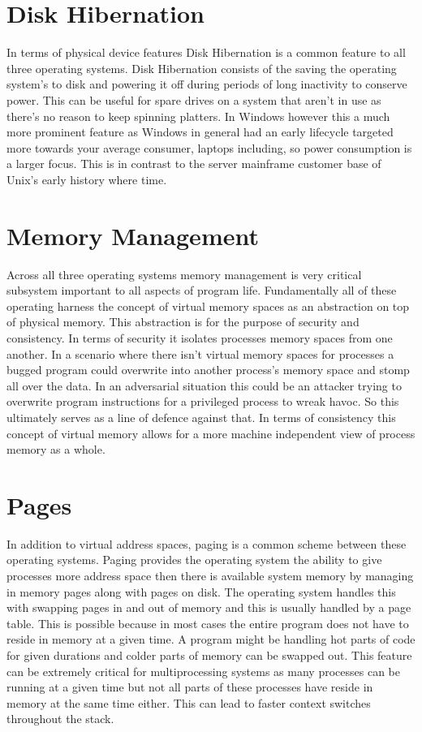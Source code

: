 \documentclass[letterpaper,10pt,draftclsnofoot,onecolumn]{IEEEtran}
\begin{document}
\section{Disk Hibernation}
In terms of physical device features Disk Hibernation is a common feature to all three operating systems. Disk Hibernation consists of the saving the operating system’s to disk and powering it off during periods of long inactivity to conserve power. This can be useful for spare drives on a system that aren’t in use as there’s no reason to keep spinning platters. In Windows however this a much more prominent feature as Windows in general had an early lifecycle targeted more towards your average consumer, laptops including, so power consumption is a larger focus. This is in contrast to the server mainframe customer base of Unix’s early history where time.\\
\newpage
\section{Memory Management}
Across all three operating systems memory management is very critical subsystem important to all aspects of program life. Fundamentally all of these operating harness the concept of virtual memory spaces as an abstraction on top of physical memory. This abstraction is for the purpose of security and consistency. In terms of security it isolates processes memory spaces from one another. In a scenario where there isn’t virtual memory spaces for processes a bugged program could overwrite into another process's memory space and stomp all over the data. In an adversarial situation this could be an attacker trying to overwrite program instructions for a privileged process to wreak havoc. So this ultimately serves as a line of defence against that. In terms of consistency this concept of virtual memory allows for a more machine independent view of process memory as a whole.\\
\section{Pages}
In addition to virtual address spaces, paging is a common scheme between these operating systems. Paging provides the operating system the ability to give processes more address space then there is available system memory by managing in memory pages along with pages on disk. The operating system handles this with swapping pages in and out of memory and this is usually handled by a page table. This is possible because in most cases the entire program does not have to reside in memory at a given time. A program might be handling hot parts of code for given durations and colder parts of memory can be swapped out. This feature can be extremely critical for multiprocessing systems as many processes can be running at a given time but not all parts of these processes have reside in memory at the same time either. This can lead to faster context switches throughout the stack.\\
\end{document}
